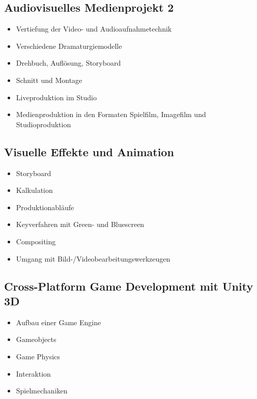\subsection{Audiovisuelles Medienprojekt
2}\label{audiovisuelles-medienprojekt-2-1}

\begin{itemize}
\tightlist
\item
  Vertiefung der Video- und Audioaufnahmetechnik
\item
  Verschiedene Dramaturgiemodelle
\item
  Drehbuch, Auflösung, Storyboard
\item
  Schnitt und Montage
\item
  Liveproduktion im Studio
\item
  Medienproduktion in den Formaten Spielfilm, Imagefilm und
  Studioproduktion
\end{itemize}

\subsection{Visuelle Effekte und
Animation}\label{visuelle-effekte-und-animation-1}

\begin{itemize}
\tightlist
\item
  Storyboard
\item
  Kalkulation
\item
  Produktionabläufe
\item
  Keyverfahren mit Green- und Bluescreen
\item
  Compositing
\item
  Umgang mit Bild-/Videobearbeitungswerkzeugen
\end{itemize}

\subsection{Cross-Platform Game Development mit Unity
3D}\label{cross-platform-game-development-mit-unity-3d-1}

\begin{itemize}
\tightlist
\item
  Aufbau einer Game Engine
\item
  Gameobjects
\item
  Game Physics
\item
  Interaktion
\item
  Spielmechaniken
\end{itemize}

